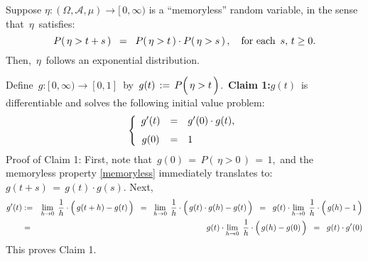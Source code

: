 
\begin{theorem}\label{ExponentialMemoryless}
\mbox{}
\vskip 0.2cm
\noindent
Suppose $\eta : (\Omega,\mathcal{A},\mu) \longrightarrow [\,0,\infty)$
is a ``memoryless'' random variable, in the sense that \,$\eta$\, satisfies:
\begin{equation}\label{memoryless}
P\!\left(\,\eta > t + s\,\right) \;\; = \;\; P\!\left(\,\eta > t \,\right) \cdot P\!\left(\,\eta > s\,\right),
\quad
\textnormal{for each \,$s,\, t \geq 0$}.
\end{equation}
Then, \,$\eta$\, follows an exponential distribution.
\end{theorem}
\proof
Define \,$g : [\,0,\infty) \longrightarrow [0,1]$\, by
\,$g(t) \, := \, P\!\left(\,\eta \overset{{\color{white}.}}{>} t\,\right)$.\,
\vskip 0.5cm
\noindent
\textbf{Claim 1:}\quad $g(t)$\, is differentiable and solves the following initial value problem:
\begin{equation}\label{IVP:exponential}
\left\{\begin{array}{ccl}
g^{\prime}(t) & = & g^{\prime}(0) \cdot g(t),
\\
\overset{{\color{white}1}}{g(0)} & = & 1
\end{array}\right.
\end{equation}
\vskip 0.2cm
\noindent
Proof of Claim 1:\quad
First, note that \,$g(0) \,=\, P(\,\eta > 0\,) \,=\, 1$,\,
and the memoryless property \eqref{memoryless} immediately translates to:
\,$g(t+s) \,=\, g(t) \cdot g(s)$.
Next,
\begin{eqnarray*}
g^{\prime}(t)
& := &
	\underset{h \rightarrow 0}{\lim}\;\,
	\dfrac{1}{h}\cdot\left(\,g(t+h) \overset{{\color{white}.}}{-} g(t)\,\right)
\;\; = \;\;
	\underset{h \rightarrow 0}{\lim}\;\,
	\dfrac{1}{h}\cdot\left(\,g(t) \cdot g(h) \overset{{\color{white}.}}{-} g(t)\,\right)
\;\; = \;\;
	g(t) \cdot
	\underset{h \rightarrow 0}{\lim}\;\,
	\dfrac{1}{h}\cdot\left(\,g(h) \overset{{\color{white}.}}{-} 1\,\right)
\\
& = &
	g(t) \cdot
	\underset{h \rightarrow 0}{\lim}\;\,
	\dfrac{1}{h}\cdot\left(\,g(h) \overset{{\color{white}.}}{-} g(0)\,\right)
\;\; = \;\;
	g(t) \cdot g^{\prime}(0)
\end{eqnarray*}
This proves Claim 1.


